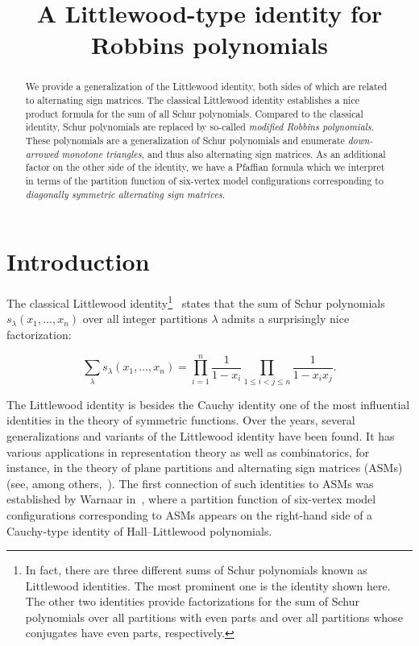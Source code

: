 \documentclass[ALCO, Unicode]{cedram}
\title{A Littlewood-type identity for Robbins polynomials}
\author{\firstname{Ilse} \lastname{Fischer}}
\author{\firstname{Hans} \lastname{H\"ongesberg}}
\begin{document}
	
	\begin{abstract}
		We provide a generalization of the Littlewood  identity, both sides of which are related to alternating sign matrices. The classical Littlewood identity establishes a nice product formula for the sum of all Schur polynomials. Compared to the classical identity, Schur polynomials are replaced by so-called \emph{modified Robbins polynomials}. These polynomials are a generalization of Schur polynomials and enumerate \emph{down-arrowed monotone triangles}, and thus also alternating sign matrices. As an additional factor on the other side of the identity, we have a Pfaffian formula which we interpret in terms of the partition function of six-vertex model configurations corresponding to \emph{diagonally symmetric alternating sign matrices}.
	\end{abstract}
	
	\maketitle
	
	\theoremstyle{plain} 
	\newtheorem{prob}[cdrthm]{Problem}
	
	\section{Introduction}
	
	The classical Littlewood identity\footnote{In fact, there are three different sums of Schur polynomials known as Littlewood identities. The most prominent one is the identity shown here. The other two identities provide factorizations for the sum of Schur polynomials over all partitions with even parts and over all partitions whose conjugates have even parts, respectively.}~\cite{Lit50} states that the sum of Schur polynomials $s_{\lambda} (x_1,\allowbreak \dots,\allowbreak x_n)$ over all integer partitions $\lambda$ admits a surprisingly nice factorization:
	
	\begin{equation}
		\label{eq:Littlewood}
		\sum_{\lambda} s_{\lambda} (x_1,\dots,x_n) = \prod_{i=1}^{n} \frac{1}{1-x_i} \prod_{1 \le i < j \le n} \frac{1}{1-x_i x_j}.
	\end{equation}
	
	The Littlewood identity is besides the Cauchy identity one of the most influential identities in the theory of symmetric functions. Over the years, several generalizations and variants of the Littlewood identity have been found. It has various applications in representation theory as well as combinatorics, for instance, in the theory of plane partitions and alternating sign matrices (ASMs) (see, among others,~\cite{Bre00,BW16,BWZJ15}). The first connection of such identities to ASMs was established by Warnaar in~\cite{War08}, where a partition function of six-vertex model configurations corresponding to ASMs appears on the right-hand side of a Cauchy-type identity of Hall--Littlewood polynomials.
	
\end{document}
